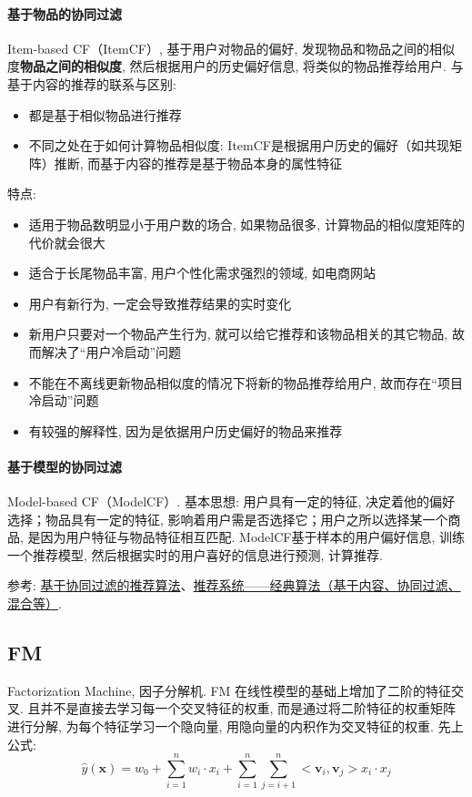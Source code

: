 \paragraph{基于物品的协同过滤}
Item-based CF（ItemCF）, 基于用户对物品的偏好, 发现物品和物品之间的相似度\textbf{物品之间的相似度}, 然后根据用户的历史偏好信息, 将类似的物品推荐给用户. 与基于内容的推荐的联系与区别: 
\begin{itemize}
	\item 都是基于相似物品进行推荐
	\item 不同之处在于如何计算物品相似度: ItemCF是根据用户历史的偏好（如共现矩阵）推断, 而基于内容的推荐是基于物品本身的属性特征
\end{itemize}
特点: 
\begin{itemize}
	\item 适用于物品数明显小于用户数的场合, 如果物品很多, 计算物品的相似度矩阵的代价就会很大
	\item 适合于长尾物品丰富, 用户个性化需求强烈的领域, 如电商网站
	\item 用户有新行为, 一定会导致推荐结果的实时变化
	\item 新用户只要对一个物品产生行为, 就可以给它推荐和该物品相关的其它物品, 故而解决了“用户冷启动”问题
	\item 不能在不离线更新物品相似度的情况下将新的物品推荐给用户, 故而存在“项目冷启动”问题
	\item 有较强的解释性, 因为是依据用户历史偏好的物品来推荐
\end{itemize}


\paragraph{基于模型的协同过滤}
Model-based CF（ModelCF）. 基本思想: 用户具有一定的特征, 决定着他的偏好选择；物品具有一定的特征, 影响着用户需是否选择它；用户之所以选择某一个商品, 是因为用户特征与物品特征相互匹配. ModelCF基于样本的用户偏好信息, 训练一个推荐模型, 然后根据实时的用户喜好的信息进行预测, 计算推荐. 

参考: \href{https://www.cnblogs.com/shengyang17/p/11516532.html}{基于协同过滤的推荐算法}、\href{https://zhuanlan.zhihu.com/p/108759393}{推荐系统——经典算法（基于内容、协同过滤、混合等）}. 




\subsection{FM}
Factorization Machine\cite{rendle_fm_2010_icdm}, 因子分解机. FM 在线性模型的基础上增加了二阶的特征交叉. 且并不是直接去学习每一个交叉特征的权重, 而是通过将二阶特征的权重矩阵进行分解, 为每个特征学习一个隐向量, 用隐向量的内积作为交叉特征的权重. 先上公式: 
$$
\hat{y}(\boldsymbol{x}) = w_0 + \sum_{i=1}^n w_i \cdot x_i + \sum_{i=1}^n \sum_{j = i+1}^n <\boldsymbol{v}_i, \boldsymbol{v}_j>x_i \cdot x_j 
$$

